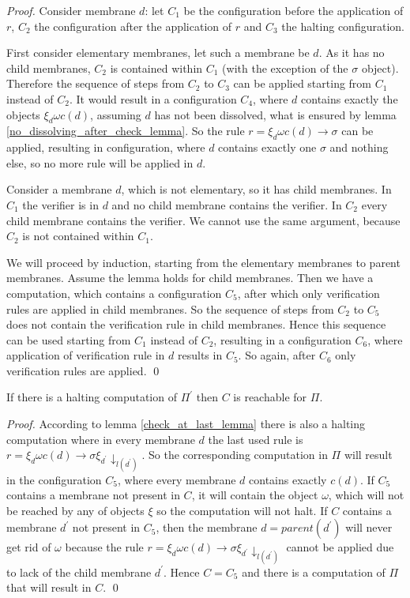 \documentclass[llncs,submission,copyright,creativecommons]{../lib/lncs/llncs}
\begin{document}
\begin{proof}
  Consider membrane $d$: let $C_1$ be the configuration before the application of $r$, $C_2$ the configuration after the application of $r$ and $C_3$ the halting configuration.

  First consider elementary membranes, let such a membrane be $d$. As it has no child membranes, $C_2$ is contained within $C_1$ (with the exception of the $\sigma$ object). Therefore the sequence of steps from $C_2$ to $C_3$ can be applied starting from $C_1$ instead of $C_2$.
  It would result in a configuration $C_4$, where $d$ contains exactly the objects $\xi_d\omega c(d)$, assuming $d$ has not been dissolved, what is ensured by lemma \ref{no_dissolving_after_check_lemma}. So the rule $r = \xi_d\omega c(d)\rightarrow\sigma$ can be applied, resulting in configuration, where $d$ contains exactly one $\sigma$ and nothing else, so no more rule will be applied in $d$.

  Consider a membrane $d$, which is not elementary, so it has child membranes. In $C_1$ the verifier is in $d$ and no child membrane contains the verifier. In $C_2$ every child membrane contains the verifier. We cannot use the same argument, because $C_2$ is not contained within $C_1$.

  We will proceed by induction, starting from the elementary membranes to parent membranes. Assume the lemma holds for child membranes. Then we have a computation, which contains a configuration $C_5$, after which only verification rules are applied in child membranes. So the sequence of steps from $C_2$ to $C_5$ does not contain the verification rule in child membranes. Hence this sequence can be used starting from $C_1$ instead of $C_2$, resulting in a configuration $C_6$, where application of verification rule in $d$ results in $C_5$. So again, after $C_6$ only verification rules are applied.
  \qed
\end{proof}

\begin{lemma}
\label{if_halting_then_reachable_lemma}
  If there is a halting computation of $\Pi^\prime$ then $C$ is reachable for $\Pi$.
\end{lemma}

\begin{proof}
  According to lemma \ref{check_at_last_lemma} there is also a halting computation where in every membrane $d$ the last used rule is $r = \xi_d\omega c(d)\rightarrow\sigma\xi_{d^\prime}\downarrow_{l(d^\prime)}$. So the corresponding computation in $\Pi$ will result in the configuration $C_5$, where every membrane $d$ contains exactly $c(d)$. If $C_5$ contains a membrane not present in $C$, it will contain the object $\omega$, which will not be reached by any of objects $\xi$ so the computation will not halt. If $C$ contains a membrane $d^\prime$ not present in $C_5$, then the membrane $d = parent(d^\prime)$ will never get rid of $\omega$ because the rule $r = \xi_d\omega c(d)\rightarrow\sigma\xi_{d^\prime}\downarrow_{l(d^\prime)}$ cannot be applied due to lack of the child membrane $d^\prime$. Hence $C = C_5$ and there is a computation of $\Pi$ that will result in $C$. \qed
\end{proof}
\end{document}

